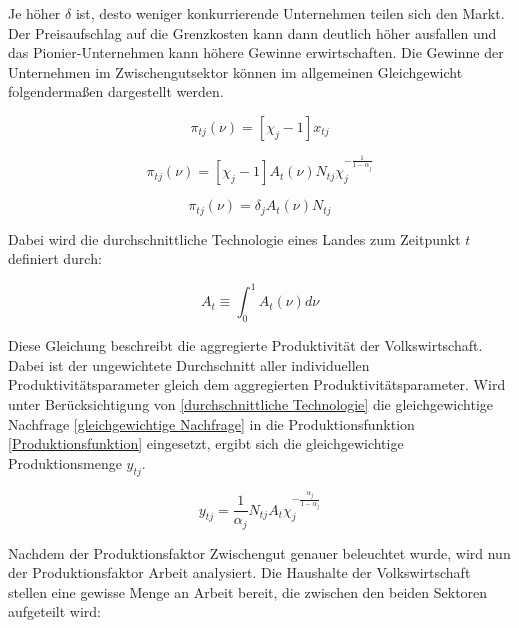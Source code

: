 Je höher $\delta$ ist, desto weniger konkurrierende Unternehmen teilen sich den Markt. Der Preisaufschlag auf die Grenzkosten kann dann deutlich höher ausfallen und das Pionier-Unternehmen kann höhere Gewinne erwirtschaften. Die Gewinne der Unternehmen im Zwischengutsektor können im allgemeinen Gleichgewicht folgenderma{\ss}en dargestellt werden.


	\begin{equation}
		\pi_{tj}(\nu)=[\chi_{j}-1]x_{tj}
	\end{equation}


\vspace{-0.5cm}


	\begin{equation}
		\pi_{tj}(\nu)=[\chi_{j}-1]A_{t}(\nu)N_{tj}\chi_{j}^{-\frac{1}{1-\alpha_{j}}}
	\end{equation}


\vspace{-0.5cm}

	
	\begin{equation}
		\pi_{tj}(\nu)=\delta_{j}A_{t}(\nu)N_{tj}
	\end{equation}


Dabei wird die durchschnittliche Technologie eines Landes zum Zeitpunkt $t$ definiert durch: 


	\begin{equation}
		A_{t}\equiv\int_0^1A_{t}(\nu)d\nu\label{durchschnittliche Technologie}
	\end{equation}


Diese Gleichung beschreibt die aggregierte Produktivität der Volkswirtschaft. Dabei ist der ungewichtete Durchschnitt aller individuellen Produktivitätsparameter gleich dem aggregierten Produktivitätsparameter. Wird unter Berücksichtigung von \eqref{durchschnittliche Technologie} die gleichgewichtige Nachfrage \eqref{gleichgewichtige Nachfrage} in die Produktionsfunktion \eqref{Produktionsfunktion} eingesetzt, ergibt sich die gleichgewichtige Produktionsmenge $y_{tj}$. 


	\begin{equation}
		y_{tj}=\frac{1}{\alpha_j}N_{tj}A_t\chi_j^{-\frac{\alpha_j}{1-\alpha_j}}
	\end{equation}

\bigskip
Nachdem der Produktionsfaktor Zwischengut genauer beleuchtet wurde, wird nun der Produktionsfaktor Arbeit analysiert. Die Haushalte der Volkswirtschaft stellen eine gewisse Menge an Arbeit bereit, die zwischen den beiden Sektoren aufgeteilt wird: 


